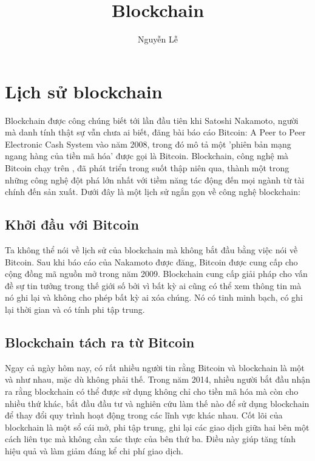 \documentclass[12pt,a4paper]{article}
\title{Blockchain}
\author{Nguyễn Lễ}
\begin{document}
\maketitle

\begin{abstract}

\end{abstract}

\section{Lịch sử blockchain}

Blockchain được công chúng biết tới lần đầu tiên khi Satoshi Nakamoto, người mà danh tính thật sự  vẫn chưa ai biết, đăng bài báo cáo Bitcoin: A Peer to Peer Electronic Cash System vào năm 2008, trong đó mô tả một 'phiên bản mạng ngang hàng của tiền mã hóa' được gọi là Bitcoin.  Blockchain, công nghệ mà Bitcoin chạy trên  , đã phát triển trong suốt thập niên qua, thành một trong những công nghệ đột phá lớn nhất với tiềm năng tác động đến mọi ngành từ tài chính đến sản xuất. Dưới đây là một lịch sử ngắn gọn về công nghệ blockchain:

\subsection{Khởi đầu với Bitcoin}
Ta không thể  nói về lịch sử của blockchain mà không bắt đầu bằng việc nói về Bitcoin. Sau khi báo cáo của Nakamoto được đăng, Bitcoin được cung cấp cho cộng đồng mã nguồn mở trong năm 2009. Blockchain cung cấp giải pháp cho vấn đề sự tin tưởng trong thế giới số bởi vì bất kỳ ai cũng có thể xem thông tin mà nó ghi lại và không cho phép bất kỳ ai xóa chúng. Nó có tinh minh bạch, có ghi lại thời gian và có tính phi tập trung.


\subsection{Blockchain tách ra từ Bitcoin}

Ngay cả ngày hôm nay, có rất nhiều người tin rằng Bitcoin và blockchain là một và như nhau, mặc dù không phải thế. Trong năm 2014, nhiều người bắt đầu nhận ra  rằng blockchain có thể được sử dụng không chỉ cho tiền mã hóa mà còn cho nhiều thứ khác, bắt đầu đầu tư và nghiên cứu làm thế nào để sử dụng blockchain để thay đổi  quy trình hoạt động trong các lĩnh vực khác nhau. Cốt lõi của blockchain là một sổ cái mở, phi tập trung, ghi lại các giao dịch giữa hai bên một cách liên tục mà không cần xác thực của bên thứ ba. Điều này giúp tăng tính hiệu quả và làm giảm đáng kể chi phí giao dịch.
\end{document}
